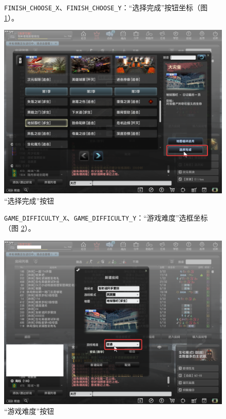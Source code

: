 \begin{figure}[H]
    \Centering
    \parbox[l]{\textwidth}{\lstinline{FINISH_CHOOSE_X}、\lstinline{FINISH_CHOOSE_Y}：“选择完成”按钮坐标（图 \ref{ch2fig-finish-choose}）。}
    \includegraphics[width=\textwidth]{docs/assets/finish_choose.png}
    \caption{“选择完成”按钮}
    \label{ch2fig-finish-choose}
\end{figure}

\begin{figure}[H]
    \Centering
    \parbox[l]{\textwidth}{\lstinline{GAME_DIFFICULTY_X}、\lstinline{GAME_DIFFICULTY_Y}：“游戏难度”选框坐标（图 \ref{ch2fig-choose-difficulty}）。}
    \includegraphics[width=\textwidth]{docs/assets/choose_difficulty.png}
    \caption{“游戏难度”按钮}
    \label{ch2fig-choose-difficulty}
\end{figure}

